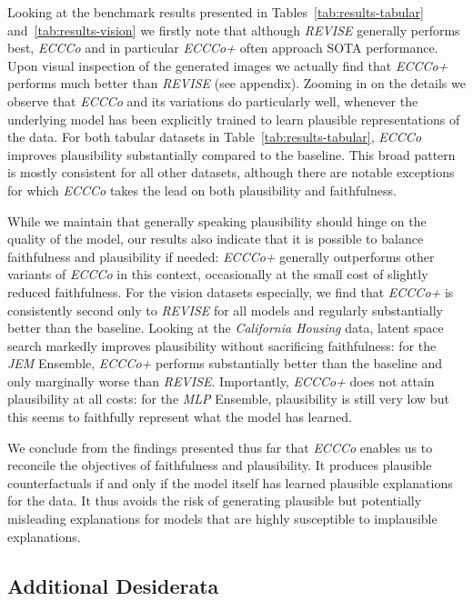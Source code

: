 \documentclass[letterpaper]{article} %
\begin{document}
Looking at the benchmark results presented in Tables~\ref{tab:results-tabular} and~\ref{tab:results-vision} we firstly note that although \textit{REVISE} generally performs best, \textit{ECCCo} and in particular \textit{ECCCo+} often approach SOTA performance. Upon visual inspection of the generated images we actually find that \textit{ECCCo+} performs much better than \textit{REVISE} (see appendix). Zooming in on the details we observe that \textit{ECCCo} and its variations do particularly well, whenever the underlying model has been explicitly trained to learn plausible representations of the data. For both tabular datasets in Table~\ref{tab:results-tabular}, \textit{ECCCo} improves plausibility substantially compared to the baseline. This broad pattern is mostly consistent for all other datasets, although there are notable exceptions for which \textit{ECCCo} takes the lead on both plausibility and faithfulness. 

While we maintain that generally speaking plausibility should hinge on the quality of the model, our results also indicate that it is possible to balance faithfulness and plausibility if needed: \textit{ECCCo+} generally outperforms other variants of \textit{ECCCo} in this context, occasionally at the small cost of slightly reduced faithfulness. For the vision datasets especially, we find that  \textit{ECCCo+} is consistently second only to \textit{REVISE} for all models and regularly substantially better than the baseline. Looking at the \textit{California Housing} data, latent space search markedly improves plausibility without sacrificing faithfulness: for the \textit{JEM} Ensemble, \textit{ECCCo+} performs substantially better than the baseline and only marginally worse than \textit{REVISE}. Importantly, \textit{ECCCo+} does not attain plausibility at all costs: for the \textit{MLP} Ensemble, plausibility is still very low but this seems to faithfully represent what the model has learned. 

We conclude from the findings presented thus far that \textit{ECCCo} enables us to reconcile the objectives of faithfulness and plausibility. It produces plausible counterfactuals if and only if the model itself has learned plausible explanations for the data. It thus avoids the risk of generating plausible but potentially misleading explanations for models that are highly susceptible to implausible explanations.

\subsection{Additional Desiderata}
\end{document}
